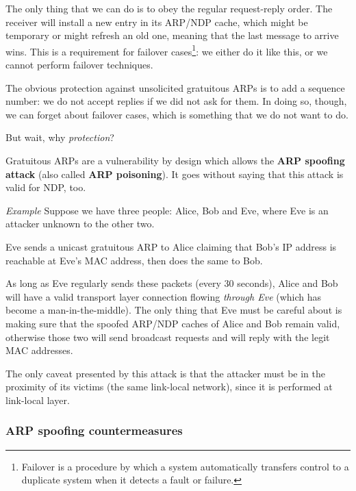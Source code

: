 The only thing that we can do is to obey the regular request-reply order. The receiver will install a new entry in its ARP/NDP cache, which might be temporary or might refresh an old one, meaning that the last message to arrive wins. This is a requirement for failover cases\footnote{Failover is a procedure by which a system automatically transfers control to a duplicate system when it detects a fault or failure.}: we either do it like this, or we cannot perform failover techniques.

The obvious protection against unsolicited gratuitous ARPs is to add a sequence number: we do not accept replies if we did not ask for them. In doing so, though, we can forget about failover cases, which is something that we do not want to do.

But wait, why \textit{protection}?

Gratuitous ARPs are a vulnerability by design which allows the \textbf{ARP spoofing attack} (also called \textbf{ARP poisoning}). It goes without saying that this attack is valid for NDP, too.

\vspace{0.5em}

\emph{Example} Suppose we have three people: Alice, Bob and Eve, where Eve is an attacker unknown to the other two.

Eve sends a unicast gratuitous ARP to Alice claiming that Bob's IP address is reachable at Eve's MAC address, then does the same to Bob.

As long as Eve regularly sends these packets (every 30 seconds), Alice and Bob will have a valid transport layer connection flowing \textit{through Eve} (which has become a man-in-the-middle). The only thing that Eve must be careful about is making sure that the spoofed ARP/NDP caches of Alice and Bob remain valid, otherwise those two will send broadcast requests and will reply with the legit MAC addresses.

\vspace{0.5em}

The only caveat presented by this attack is that the attacker must be in the proximity of its victims (the same link-local network), since it is performed at link-local layer.


\subsubsection*{ARP spoofing countermeasures}

